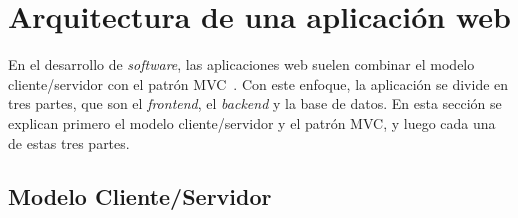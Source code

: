 


\section{Arquitectura de una aplicación web}

En el desarrollo de \emph{software}, las aplicaciones web suelen combinar el modelo cliente/servidor con el patrón MVC~\cite{wiki_mvc}. Con este enfoque, la aplicación se divide en tres partes, que son el \emph{frontend}, el \emph{backend} y la base de datos. En esta sección se explican primero el modelo cliente/servidor y el patrón MVC, y luego cada una de estas tres partes.

\subsection{Modelo Cliente/Servidor}

